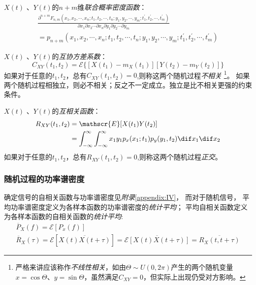     $X(t)$ 、$Y(t)$的$n+m$维\emph{联合概率密度函数}：
    \begin{equation}
        \begin{split}
            \frac{\partial^{n+m}F_{n,m}(x_1,x_2,\cdots,x_n;t_1,t_2,\cdots,t_n;y_1,y_2,\cdots,y_m;t^{'}_1,t^{'}_2,\cdots,t^{'}_m)}{\partial x_1\partial x_2\cdots\partial x_n\partial y_1\partial y_2\cdots\partial y_m}\\
            =p_{n+m}(x_1,x_2,\cdots,x_n;t_1,t_2,\cdots,t_n;y_1,y_2,\cdots,y_m;t^{'}_1,t^{'}_2,\cdots,t^{'}_m)
        \end{split}
    \end{equation}

    $X(t)$ 、$Y(t)$的\emph{互协方差系数}：
    \begin{equation}
        C_{XY}(t_1,t_2)=\mathscr{E}\{[X(t_1)-m_X(t_1)][Y(t_2)-m_Y(t_2)]\}
    \end{equation}
    如果对于任意的$t_1,t_2$，总有$C_{XY}(t_1,t_2)=0$,则称这两个随机过程\emph{不相关}
    \footnote{严格来讲应该称作\emph{不线性相关}，如由$\Theta\sim U(0,2\pi)$产生的两个随机变量$x=\cos\Theta$、$y=\sin\Theta$，虽然满足$C_{XY}=0$，但实际上出现仍受对方影响。}。 
    如果两个随机过程相独立，则必不相关；反之不一定成立。独立是比不相关更强的约束条件。

    $X(t)$ 、$Y(t)$的\emph{互相关函数}：
    \begin{equation}
        \begin{split}
            R_{XY}(t_1,t_2) &=\mathscr{E}[X(t_1)Y(t_2)]\\
                            &=\int_{-\infty}^{\infty}\int_{-\infty}^{\infty}x_1y_1p_x(x_1;t_1)p_y(y_1,t_2)\dif x_1\dif x_2
        \end{split}
    \end{equation}
    如果对于任意的$t_1,t_2$，总有$R_{XY}(t_1,t_2)=0$,则称这两个随机过程\emph{正交}。

    \subsubsection{随机过程的功率谱密度}
    确定信号的自相关函数与功率谱密度见\emph{附录}\ref{appendix:IV}，
    而对于随机信号，
    平均功率谱密度定义为各样本函数的功率谱密度的\emph{统计平均}；
    平均自相关函数定义为各样本函数的自相关函数的\emph{统计平均}:
    \begin{align}
        \overline{P}_X(f)=\mathscr{E}[P_x(f)]\hspace{10em}\\
        \overline{R}_X(\tau)=\mathscr{E}[\overline{X(t)X(t+\tau)}]=\overline{\mathscr{E}[X(t)X(t+\tau)]}=\overline{R_X(t,t+\tau)}
    \end{align}

